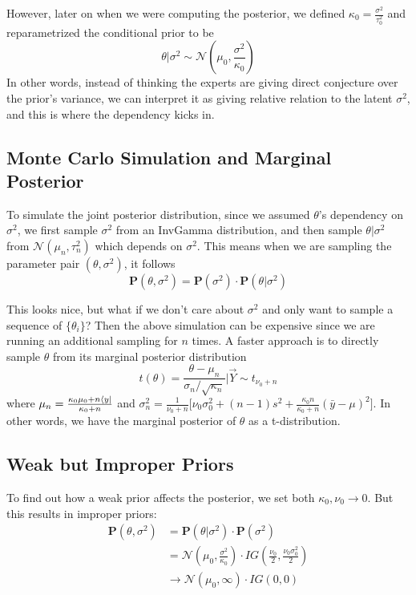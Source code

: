 However, later on when we were computing the posterior, we defined $\kappa_0 = \frac{\sigma^2}{\tau_0^2}$ and reparametrized the conditional prior to be
\begin{equation*}
    \theta | \sigma^2 \sim \mathcal{N}(\mu_0, \frac{\sigma^2}{\kappa_0})
\end{equation*}
In other words, instead of thinking the experts are giving direct conjecture over the prior's variance, we can interpret it as giving relative relation to the latent $\sigma^2$, and this is where the dependency kicks in. 

\subsection{Monte Carlo Simulation and Marginal Posterior}
To simulate the joint posterior distribution, since we assumed $\theta$'s dependency on $\sigma^2$, we first sample $\sigma^2$ from an InvGamma distribution, and then sample $\theta | \sigma^2$ from $\mathcal{N}(\mu_n, \tau_n^2)$ which depends on $\sigma^2$. This means when we are sampling the parameter pair $(\theta, \sigma^2)$, it follows
\begin{equation*}
    \mathbf{P}(\theta, \sigma^2) = \mathbf{P}(\sigma^2) \cdot \mathbf{P}(\theta | \sigma^2)
\end{equation*}

This looks nice, but what if we don't care about $\sigma^2$ and only want to sample a sequence of $\{\theta_i\}$? Then the above simulation can be expensive since we are running an additional sampling for $n$ times. A faster approach is to directly sample $\theta$ from its marginal posterior distribution
\begin{equation*}
    t(\theta) = \frac{\theta - \mu_n}{\sigma_n/\sqrt{\kappa_n}} | \vec{Y} \sim t_{\nu_0 + n}
\end{equation*}
where $\mu_n = \frac{\kappa_0 \mu_0 + n\bra{y}}{\kappa_0 + n}$ and $\sigma_n^2 = \frac{1}{\nu_0 + n}\big[ \nu_0\sigma_0^2 + (n-1)s^2 + \frac{\kappa_0 n}{\kappa_0 + n}(\bar{y} - \mu)^2 \big]$. In other words, we have the marginal posterior of $\theta$ as a t-distribution. 

\subsection{Weak but Improper Priors}
To find out how a weak prior affects the posterior, we set both $\kappa_0, \nu_0 \rightarrow 0$. But this results in improper priors:
\begin{align*}
    \mathbf{P}(\theta, \sigma^2) &= \mathbf{P}(\theta | \sigma^2) \cdot \mathbf{P}(\sigma^2) \\
    &= \mathcal{N}(\mu_0, \frac{\sigma^2}{\kappa_0}) \cdot IG(\frac{\nu_0}{2}, \frac{\nu_0\sigma_0^2}{2}) \\
    &\rightarrow \mathcal{N}(\mu_0, \infty) \cdot IG(0, 0)
\end{align*}


